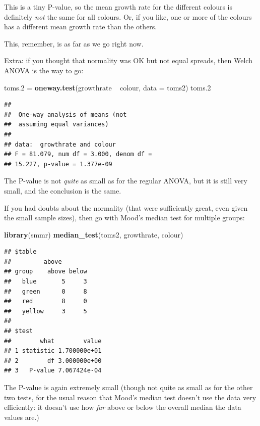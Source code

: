 \documentclass[]{tufte-book}
\newenvironment{Shaded}{}{}
\newcommand{\DataTypeTok}[1]{\textcolor[rgb]{0.56,0.13,0.00}{#1}}
\newcommand{\FloatTok}[1]{\textcolor[rgb]{0.25,0.63,0.44}{#1}}
\newcommand{\KeywordTok}[1]{\textcolor[rgb]{0.00,0.44,0.13}{\textbf{#1}}}
\newcommand{\NormalTok}[1]{#1}
\newcommand{\OperatorTok}[1]{\textcolor[rgb]{0.40,0.40,0.40}{#1}}
\newcommand{\StringTok}[1]{\textcolor[rgb]{0.25,0.44,0.63}{#1}}
\theoremstyle{definition}
\theoremstyle{definition}
\theoremstyle{definition}
\theoremstyle{remark}
\begin{document}
This is a tiny P-value, so the mean growth rate for the different
colours is definitely \emph{not} the same for all colours. Or, if you
like, one or more of the colours has a different mean growth rate than
the others.

This, remember, is as far as we go right now.

Extra: if you thought that normality was OK but not equal spreads, then
Welch ANOVA is the way to go:

\begin{Shaded}
\begin{Highlighting}[]
\NormalTok{toms}\FloatTok{.2}\NormalTok{ =}\StringTok{ }\KeywordTok{oneway.test}\NormalTok{(growthrate }\OperatorTok{~}\StringTok{ }\NormalTok{colour, }\DataTypeTok{data =}\NormalTok{ toms2)}
\NormalTok{toms}\FloatTok{.2}
\end{Highlighting}
\end{Shaded}

\begin{verbatim}
## 
##  One-way analysis of means (not
##  assuming equal variances)
## 
## data:  growthrate and colour
## F = 81.079, num df = 3.000, denom df =
## 15.227, p-value = 1.377e-09
\end{verbatim}

The P-value is not \emph{quite} as small as for the regular ANOVA, but
it is still very small, and the conclusion is the same.

If you had doubts about the normality (that were sufficiently great,
even given the small sample sizes), then go with Mood's median test for
multiple groups:

\begin{Shaded}
\begin{Highlighting}[]
\KeywordTok{library}\NormalTok{(smmr)}
\KeywordTok{median_test}\NormalTok{(toms2, growthrate, colour)}
\end{Highlighting}
\end{Shaded}

\begin{verbatim}
## $table
##         above
## group    above below
##   blue       5     3
##   green      0     8
##   red        8     0
##   yellow     3     5
## 
## $test
##        what        value
## 1 statistic 1.700000e+01
## 2        df 3.000000e+00
## 3   P-value 7.067424e-04
\end{verbatim}

The P-value is again extremely small (though not quite as small as for
the other two tests, for the usual reason that Mood's median test
doesn't use the data very efficiently: it doesn't use how \emph{far}
above or below the overall median the data values are.)
\end{document}

